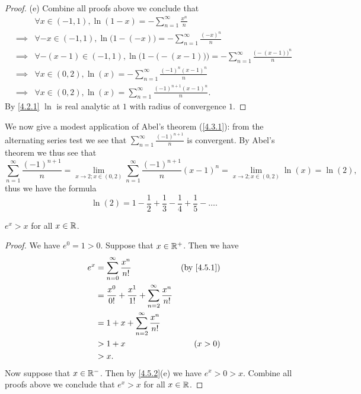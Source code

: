 \begin{proof}{(e)}
  Combine all proofs above we conclude that
  \begin{align*}
             & \forall x \in (-1, 1), \ln(1 - x) = - \sum_{n = 1}^\infty \frac{x^n}{n}                                                  \\
    \implies & \forall -x \in (-1, 1), \ln\big(1 - (-x)\big) = - \sum_{n = 1}^\infty \frac{(-x)^n}{n}                                   \\
    \implies & \forall -(x - 1) \in (-1, 1), \ln\Big(1 - \big(-(x - 1)\big)\Big) = - \sum_{n = 1}^\infty \frac{\big(-(x - 1)\big)^n}{n} \\
    \implies & \forall x \in (0, 2), \ln(x) = - \sum_{n = 1}^\infty \frac{(-1)^n (x - 1)^n}{n}                                          \\
    \implies & \forall x \in (0, 2), \ln(x) = \sum_{n = 1}^\infty \frac{(-1)^{n + 1} (x - 1)^n}{n}.
  \end{align*}
  By \cref{4.2.1} \(\ln\) is real analytic at \(1\) with radius of convergence \(1\).
\end{proof}

\begin{eg}\label{4.5.7}
  We now give a modest application of Abel's theorem (\cref{4.3.1}):
  from the alternating series test we see that \(\sum_{n = 1}^\infty \frac{(-1)^{n + 1}}{n}\) is convergent.
  By Abel's theorem we thus see that
  \[
    \sum_{n = 1}^\infty \frac{(-1)^{n + 1}}{n} = \lim_{x \to 2 ; x \in (0, 2)} \sum_{n = 1}^\infty \frac{(-1)^{n + 1}}{n} (x - 1)^n = \lim_{x \to 2 ; x \in (0, 2)} \ln(x) = \ln(2),
  \]
  thus we have the formula
  \[
    \ln(2) = 1 - \frac{1}{2} + \frac{1}{3} - \frac{1}{4} +\frac{1}{5} - \dots.
  \]
\end{eg}

\begin{ac}\label{ac:4.5.1}
  \(e^x > x\) for all \(x \in \mathbb{R}\).
\end{ac}

\begin{proof}
  We have \(e^0 = 1 > 0\).
  Suppose that \(x \in \mathbb{R}^+\).
  Then we have
  \begin{align*}
    e^x & = \sum_{n = 0}^\infty \frac{x^n}{n!}                                   & \text{(by \cref{4.5.1})} \\
        & = \frac{x^0}{0!} + \frac{x^1}{1!} + \sum_{n = 2}^\infty \frac{x^n}{n!}                            \\
        & = 1 + x + \sum_{n = 2}^\infty \frac{x^n}{n!}                                                      \\
        & > 1 + x                                                                & (x > 0)                  \\
        & > x.
  \end{align*}
  Now suppose that \(x \in \mathbb{R}^-\).
  Then by \cref{4.5.2}(e) we have \(e^x > 0 > x\).
  Combine all proofs above we conclude that \(e^x > x\) for all \(x \in \mathbb{R}\).
\end{proof}

